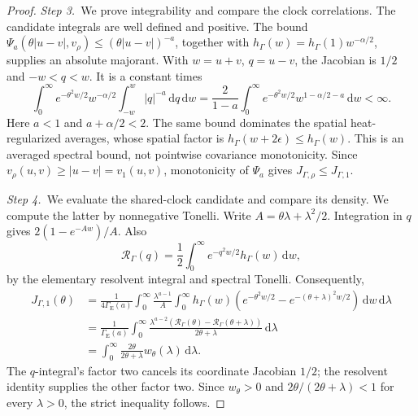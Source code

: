 \documentclass[12pt,oneside,openany]{book}
\numberwithin{equation}{section}
\theoremstyle{nogostyle}
\theoremstyle{definition}
\newcommand{\ud}{\,\mathrm{d}}
\begin{document}
\begin{proof}
  \medskip
  \noindent\textit{Step 3.~}We prove integrability and compare the clock
  correlations.
  The candidate integrals are well defined and positive. The bound
  \(\Psi_a(\theta|u-v|,v_\rho)\le (\theta|u-v|)^{-a}\), together with
  \(h_\Gamma(w)=h_\Gamma(1)w^{-\alpha/2}\), supplies an absolute majorant. With
  \(w=u+v\), \(q=u-v\), the Jacobian is \(1/2\) and \(-w<q<w\). It is a constant
  times
  \[
    \int_0^\infty e^{-\theta^2w/2}w^{-\alpha/2}
    \int_{-w}^w|q|^{-a}\ud q\ud w
    =\frac2{1-a}\int_0^\infty
    e^{-\theta^2w/2}w^{1-\alpha/2-a}\ud w<\infty .
  \]
  Here \(a<1\) and \(a+\alpha/2<2\). The same bound dominates the spatial
  heat-regularized averages, whose spatial factor is \(h_\Gamma(w+2\epsilon)\le
  h_\Gamma(w)\). This is an averaged spectral bound, not pointwise covariance
  monotonicity. Since \(v_\rho(u,v)\ge|u-v|=v_1(u,v)\), monotonicity of
  \(\Psi_a\) gives \(J_{\Gamma,\rho}\le J_{\Gamma,1}\).


  \medskip
  \noindent\textit{Step 4.~}We evaluate the shared-clock candidate and compare
  its density.
  We compute the latter by nonnegative Tonelli. Write
  \(A=\theta\lambda+\lambda^2/2\). Integration in \(q\) gives
  \(2(1-e^{-Aw})/A\). Also
  \[
    \mathcal{R}_\Gamma(q)
    =\frac12\int_0^\infty e^{-q^2w/2}h_\Gamma(w)\ud w,
  \]
  by the elementary resolvent integral and spectral Tonelli. Consequently,
  \[
    \begin{split}
      J_{\Gamma,1}(\theta)
      &=\frac1{4\Gamma_{\mathrm{E}}(a)}
      \int_0^\infty\frac{\lambda^{a-1}}A
      \int_0^\infty h_\Gamma(w)
      \left(e^{-\theta^2w/2}
      -e^{-(\theta+\lambda)^2w/2}\right)\ud w\ud\lambda\\
      &=\frac1{\Gamma_{\mathrm{E}}(a)}
      \int_0^\infty
      \frac{\lambda^{a-2}
      (\mathcal{R}_\Gamma(\theta)-\mathcal{R}_\Gamma(\theta+\lambda))}
      {2\theta+\lambda}\ud\lambda\\
      &=\int_0^\infty
      \frac{2\theta}{2\theta+\lambda}w_\theta(\lambda)\ud\lambda.
    \end{split}
  \]
  The \(q\)-integral's factor two cancels its coordinate Jacobian \(1/2\); the
  resolvent identity supplies the other factor two. Since \(w_\theta>0\) and
  \(2\theta/(2\theta+\lambda)<1\) for every \(\lambda>0\), the strict inequality
  follows.



\end{proof}
\end{document}
